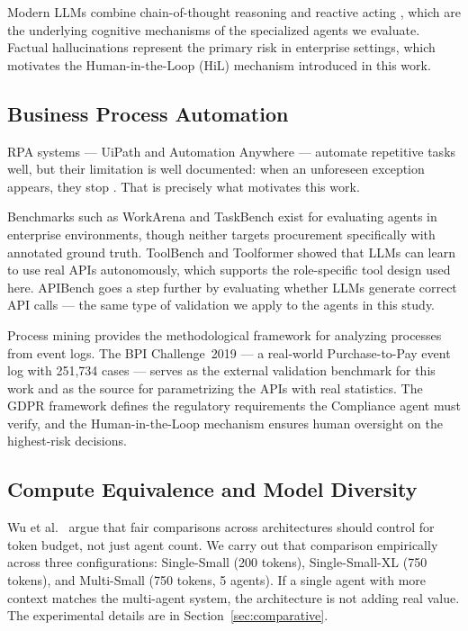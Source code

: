 \documentclass[preprint,12pt,numrefs]{elsarticle}
\begin{document}
Modern LLMs combine chain-of-thought reasoning \citep{Wei2022cot} and
reactive acting \citep{Yao2023react}, which are the underlying cognitive
mechanisms of the specialized agents we evaluate. Factual hallucinations
\citep{Ji2023hallucination} represent the primary risk in enterprise
settings, which motivates the Human-in-the-Loop (HiL) mechanism
introduced in this work.

\subsection{Business Process Automation}

RPA systems --- UiPath \citep{UiPath2023} and Automation Anywhere
\citep{AutomationAnywhere2023} --- automate repetitive tasks well, but
their limitation is well documented: when an unforeseen exception
appears, they stop \citep{Aguirre2017rpa}. That is precisely what
motivates this work.

Benchmarks such as WorkArena \citep{drouin2024workarena} and TaskBench
\citep{lu2023taskbench} exist for evaluating agents in enterprise
environments, though neither targets procurement specifically with
annotated ground truth. ToolBench \citep{qin2023toolllm} and Toolformer
\citep{Schick2023toolformer} showed that LLMs can learn to use real APIs
autonomously, which supports the role-specific tool design used here.
APIBench \citep{patil2023gorilla} goes a step further by evaluating
whether LLMs generate correct API calls --- the same type of validation
we apply to the agents in this study.

Process mining \citep{VanDerAalst2011pm,VanDerAalst2012} provides the
methodological framework for analyzing processes from event logs. The
BPI Challenge~2019 \citep{vandongen2019bpi,VanDongen2011bpi} --- a
real-world Purchase-to-Pay event log with 251,734 cases --- serves as
the external validation benchmark for this work and as the source for
parametrizing the APIs with real statistics. The GDPR framework
\citep{GDPR2016} defines the regulatory requirements the Compliance
agent must verify, and the Human-in-the-Loop mechanism
\citep{Mosqueira2023hitl} ensures human oversight on the
highest-risk decisions.

\subsection{Compute Equivalence and Model Diversity}

Wu et al.\ \citep{wu2023autogen} argue that fair comparisons across
architectures should control for token budget, not just agent count.
We carry out that comparison empirically across three configurations:
Single-Small (200 tokens), Single-Small-XL (750 tokens), and
Multi-Small (750 tokens, 5 agents). If a single agent with more context
matches the multi-agent system, the architecture is not adding real
value. The experimental details are in Section~\ref{sec:comparative}.
\end{document}
